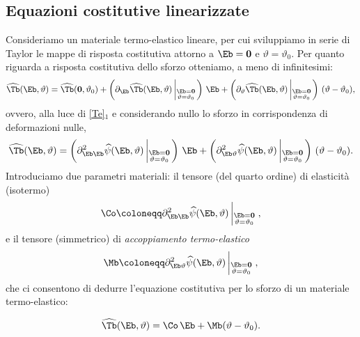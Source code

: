 \subsection{Equazioni costitutive linearizzate}
Consideriamo un materiale termo-elastico lineare, per cui sviluppiamo in serie di Taylor le mappe di risposta costitutiva attorno a $\Eb=\mathbf{0}$ e $\vartheta=\vartheta_0$.
Per quanto riguarda a risposta costitutiva dello sforzo otteniamo, a meno di infinitesimi:
\begin{equation}
\widehat{\Tb}(\Eb, \vartheta)=\widehat{\Tb}(\mathbf{0}, \vartheta_0)+\left(\partial_\Eb \widehat{\Tb}(\Eb, \vartheta)\left|_{\substack{\Eb=\mathbf{0} \\ \vartheta=\vartheta_0}}\right.\right)\, \Eb+\left(\partial_\vartheta \widehat{\Tb}(\Eb, \vartheta)
\left|_{\substack{\Eb=\mathbf{0} \\ \vartheta=\vartheta_0}}\right.\right)\,(\vartheta-\vartheta_0),
\end{equation}
ovvero, alla luce di \eqref{Te}$_1$ e considerando nullo lo sforzo in corrispondenza di deformazioni nulle, 
\begin{equation}
	\widehat{\Tb}(\Eb, \vartheta)=\left(\partial^2_{\Eb\Eb} \widehat{\psi}(\Eb, \vartheta)\left|_{\substack{\Eb=\mathbf{0} \\ \vartheta=\vartheta_0}}\right.\right)\, \Eb+\left(\partial^2_{\Eb\vartheta} \widehat{\psi}(\Eb, \vartheta)
	\left|_{\substack{\Eb=\mathbf{0} \\ \vartheta=\vartheta_0}}\right.\right)\,(\vartheta-\vartheta_0).
\end{equation}
Introduciamo due parametri materiali: il tensore (del quarto ordine) di elasticità (isotermo)
\begin{equation}
\Co\coloneqq \partial^2_{\Eb\Eb} \widehat{\psi}(\Eb, \vartheta)\left|_{\substack{\Eb=\mathbf{0} \\ \vartheta=\vartheta_0}}\right.,
\end{equation}
e il tensore (simmetrico) di \textit{accoppiamento termo-elastico}
\begin{equation}
\Mb\coloneqq	\partial^2_{\Eb\vartheta} \widehat{\psi}(\Eb, \vartheta)
	\left|_{\substack{\Eb=\mathbf{0} \\ \vartheta=\vartheta_0}}\right.,
\end{equation}
che ci consentono di dedurre l'equazione costitutiva per lo sforzo di un materiale termo-elastico:
\begin{definition}
\begin{equation}\label{TTe}
	\widehat{\Tb}(\Eb, \vartheta)=\Co\,\Eb+\Mb (\vartheta-\vartheta_0).
\end{equation}
\end{definition}

